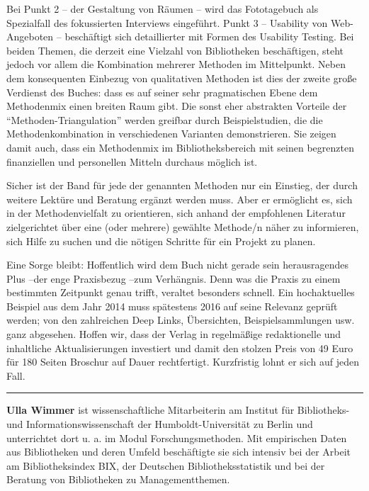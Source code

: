 \documentclass[a4paper,
fontsize=11pt,
oneside,
numbers=noperiodatend,
parskip=half-,
bibliography=totoc,
final
]{scrartcl}
\begin{document}
Bei Punkt 2 -- der Gestaltung von Räumen -- wird das Fototagebuch als
Spezialfall des fokussierten Interviews eingeführt. Punkt 3 -- Usability
von Web-Angeboten -- beschäftigt sich detaillierter mit Formen des
Usability Testing. Bei beiden Themen, die derzeit eine Vielzahl von
Bibliotheken beschäftigen, steht jedoch vor allem die Kombination
mehrerer Methoden im Mittelpunkt. Neben dem konsequenten Einbezug von
qualitativen Methoden ist dies der zweite große Verdienst des Buches:
dass es auf seiner sehr pragmatischen Ebene dem Methodenmix einen
breiten Raum gibt. Die sonst eher abstrakten Vorteile der
\enquote{Methoden-Triangulation} werden greifbar durch Beispielstudien,
die die Methodenkombination in verschiedenen Varianten demonstrieren.
Sie zeigen damit auch, dass ein Methodenmix im Bibliotheksbereich mit
seinen begrenzten finanziellen und personellen Mitteln durchaus möglich
ist.

Sicher ist der Band für jede der genannten Methoden nur ein Einstieg,
der durch weitere Lektüre und Beratung ergänzt werden muss. Aber er
ermöglicht es, sich in der Methodenvielfalt zu orientieren, sich anhand
der empfohlenen Literatur zielgerichtet über eine (oder mehrere)
gewählte Methode/n näher zu informieren, sich Hilfe zu suchen und die
nötigen Schritte für ein Projekt zu planen.

Eine Sorge bleibt: Hoffentlich wird dem Buch nicht gerade sein
herausragendes Plus --der enge Praxisbezug --zum Verhängnis. Denn was
die Praxis zu einem bestimmten Zeitpunkt genau trifft, veraltet
besonders schnell. Ein hochaktuelles Beispiel aus dem Jahr 2014 muss
spätestens 2016 auf seine Relevanz geprüft werden; von den zahlreichen
Deep Links, Übersichten, Beispielsammlungen usw. ganz abgesehen. Hoffen
wir, dass der Verlag in regelmäßige redaktionelle und inhaltliche
Aktualisierungen investiert und damit den stolzen Preis von 49 Euro für
180 Seiten Broschur auf Dauer rechtfertigt. Kurzfristig lohnt er sich
auf jeden Fall.~

\begin{center}\rule{3in}{0.4pt}\end{center}

\textbf{Ulla Wimmer} ist wissenschaftliche Mitarbeiterin am Institut für
Bibliotheks- und Informationswissenschaft der Humboldt-Universität zu
Berlin und unterrichtet dort u. a. im Modul Forschungsmethoden. Mit
empirischen Daten aus Bibliotheken und deren Umfeld beschäftigte sie
sich intensiv bei der Arbeit am Bibliotheksindex BIX, der Deutschen
Bibliotheksstatistik und bei der Beratung von Bibliotheken zu
Managementthemen.
\end{document}
